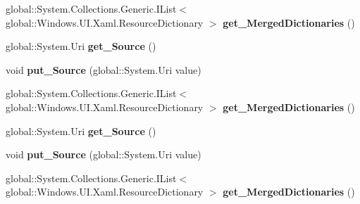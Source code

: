 \begin{DoxyCompactItemize}
global\+::\+System.\+Collections.\+Generic.\+I\+List$<$ global\+::\+Windows.\+U\+I.\+Xaml.\+Resource\+Dictionary $>$ {\bfseries get\+\_\+\+Merged\+Dictionaries} ()
\item 
\mbox{\label{interface_windows_1_1_u_i_1_1_xaml_1_1_i_resource_dictionary_a76dcde97b7d0bf8406589caca8feef64}} 
global\+::\+System.\+Uri {\bfseries get\+\_\+\+Source} ()
\item 
\mbox{\label{interface_windows_1_1_u_i_1_1_xaml_1_1_i_resource_dictionary_a8d5669e35c8e6ad0622049bf239bc760}} 
void {\bfseries put\+\_\+\+Source} (global\+::\+System.\+Uri value)
\item 
\mbox{\label{interface_windows_1_1_u_i_1_1_xaml_1_1_i_resource_dictionary_a5bfd581ecb0bf11f53eb2e228d657388}} 
global\+::\+System.\+Collections.\+Generic.\+I\+List$<$ global\+::\+Windows.\+U\+I.\+Xaml.\+Resource\+Dictionary $>$ {\bfseries get\+\_\+\+Merged\+Dictionaries} ()
\item 
\mbox{\label{interface_windows_1_1_u_i_1_1_xaml_1_1_i_resource_dictionary_a76dcde97b7d0bf8406589caca8feef64}} 
global\+::\+System.\+Uri {\bfseries get\+\_\+\+Source} ()
\item 
\mbox{\label{interface_windows_1_1_u_i_1_1_xaml_1_1_i_resource_dictionary_a8d5669e35c8e6ad0622049bf239bc760}} 
void {\bfseries put\+\_\+\+Source} (global\+::\+System.\+Uri value)
\item 
\mbox{\label{interface_windows_1_1_u_i_1_1_xaml_1_1_i_resource_dictionary_a5bfd581ecb0bf11f53eb2e228d657388}} 
global\+::\+System.\+Collections.\+Generic.\+I\+List$<$ global\+::\+Windows.\+U\+I.\+Xaml.\+Resource\+Dictionary $>$ {\bfseries get\+\_\+\+Merged\+Dictionaries} ()
\item 
\mbox{\label{interface_windows_1_1_u_i_1_1_xaml_1_1_i_resource_dictionary_a76dcde97b7d0bf8406589caca8feef64}} 

\end{DoxyCompactItemize}
